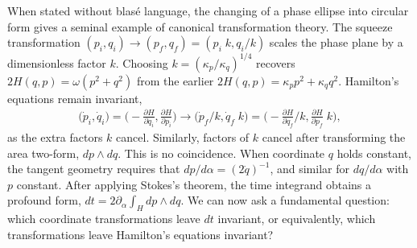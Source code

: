 \documentclass[nofootinbib,preprint]{revtex4-1}
\begin{document}
When stated without blas\'{e} language, the changing of a phase ellipse 
into circular form gives a seminal example of canonical transformation theory. The 
squeeze transformation $(p_i,q_i) \rightarrow (p_f,q_f)=(p_i\;k,q_i/k)$ scales the 
phase plane by a dimensionless factor $k$. Choosing $k=(\kappa_p/\kappa_q)^{1/4}$ recovers 
$2H(q,p)=\omega(p^2+q^2)$ from the earlier ${2H(q,p)=\kappa_p p^2+\kappa_q q^2}$. 
Hamilton's equations remain invariant, 
\begin{eqnarray}
\Big(\dot{p}_i,\dot{q}_i\Big) 
= \bigg(-\frac{\partial H }{\partial q_i}, \frac{\partial H}{\partial p_i} \bigg) \nonumber
\longrightarrow
\Big(\dot{p}_f/k,\dot{q}_f\;k\Big) 
= \bigg(-\frac{\partial H }{\partial q_f}/k, \frac{\partial H}{\partial p_f}\;k \bigg),
\end{eqnarray}
as the extra factors $k$ cancel. Similarly, factors of $k$ cancel after transforming
the area two-form, $dp \wedge dq$. This is no coincidence. When coordinate $q$ holds 
constant, the tangent geometry requires that $dp/d\alpha = (2\dot{q})^{-1}$, and similar for 
$dq/d\alpha$ with $p$ constant. After applying Stokes's theorem, the time integrand 
obtains a profound form, $dt=2\partial_{\alpha} \int_H dp\wedge dq$. We can now ask a fundamental
question: which coordinate transformations leave $dt$ invariant, or equivalently, which 
transformations leave Hamilton's equations invariant?
\end{document}
